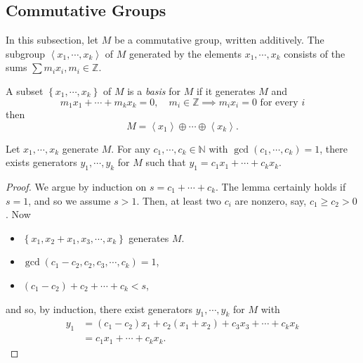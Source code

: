 \subsection{Commutative Groups}
\label{subsection-commutative-groups}
In this subsection, let \( M \) be a commutative group, written additively.
The subgroup \( \left\langle x_1, \cdots, x_k \right\rangle \) of \( M \) generated by the elements \( x_1, \cdots, x_k \) consists of the sums \( \sum m_i x_i, m_i \in \mathbb{Z} \).

\begin{definition}
  \label{definition-basis}
  A subset \( \left\lbrace x_1, \cdots, x_k \right\rbrace \) of \( M \) is a \emph{basis} for \( M \) if it generates \( M \) and
  \[
    m_1 x_1 + \cdots + m_k x_k = 0,\quad m_i \in \mathbb{Z} \implies m_i x_i = 0 \text{ for every } i
  \]
  then
  \[
    M = \left\langle x_1 \right\rangle \oplus \cdots \oplus \left\langle x_k \right\rangle.
  \]
\end{definition}

\begin{lemma}
  \label{lemma-change-basis}
  Let \( x_1, \cdots, x_k \) generate \( M \).
  For any \( c_1, \cdots, c_k \in \mathbb{N} \) with \( \gcd (c_1, \cdots, c_k) = 1 \), there exists generators \( y_1, \cdots, y_k \) for \( M \) such that \( y_1 = c_1 x_1 + \cdots + c_k x_k \).
\end{lemma}
\begin{proof}
  We argue by induction on \( s = c_1 + \cdots + c_k \).
  The lemma certainly holds if \( s = 1 \), and so we assume \( s > 1 \).
  Then, at least two \( c_i \) are nonzero, say, \( c_1 \geq c_2 > 0 \).
  Now
  \begin{itemize}
    \item \( \left\lbrace x_1, x_2 + x_1, x_3, \cdots, x_k \right\rbrace \) generates \( M \).
    \item \( \gcd(c_1 - c_2, c_2, c_3, \cdots, c_k) = 1 \),
    \item \( (c_1 - c_2) + c_2 + \cdots + c_k < s \),
  \end{itemize}
  and so, by induction, there exist generators \( y_1, \cdots, y_k \) for \( M \) with
  \begin{align*}
    y_1 &= (c_1 - c_2) x_1 + c_2(x_1 + x_2) + c_3 x_3 + \cdots + c_k x_k\\
        &= c_1 x_1 + \cdots + c_k x_k.
  \end{align*}
\end{proof}

